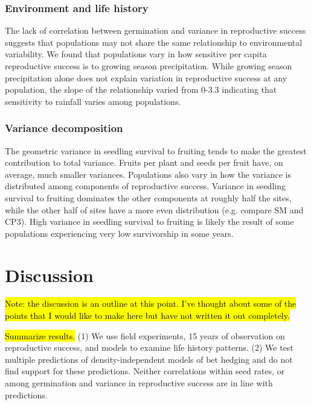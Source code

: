 \documentclass[12pt, oneside, titlepage]{article}   	%
\begin{document}
{\subsubsection*{Environment and life history}

The lack of correlation between germination and variance in reproductive success suggests that populations may not share the same relationship to environmental variability. We found that populations vary in how sensitive per capita reproductive success is to growing season precipitation. While growing season precipitation alone does not explain variation in reproductive success at any population, the slope of the relationship varied from 0-3.3 indicating that sensitivity to rainfall varies among populations.

\subsubsection*{Variance decomposition}

The geometric variance in seedling survival to fruiting tends to make the greatest contribution to total variance. Fruits per plant and seeds per fruit have, on average, much smaller variances. Populations also vary in how the variance is distributed among components of reproductive success. Variance in seedling survival to fruiting dominates the other components at roughly half the sites, while the other half of sites have a more even distribution (e.g. compare SM and CP3). High variance in seedling survival to fruiting is likely the result of some populations experiencing very low survivorship in some years.

\section*{Discussion}

\hl{Note: the discussion is an outline at this point. I've thought about some of the points that I would like to make here but have not written it out completely.}

\hl{Summarize results.} (1) We use field experiments, 15 years of observation on reproductive success, and models to examine life history patterns. (2) We test multiple predictions of density-independent models of bet hedging and do not find support for these predictions. Neither correlations within seed rates, or among germination and variance in reproductive success are in line with predictions. 

}
\end{document}
